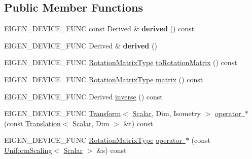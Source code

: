 \subsection*{Public Member Functions}
\begin{DoxyCompactItemize}
\item 
\mbox{\label{class_eigen_1_1_rotation_base_a1cae30fa6779f33fb835c91d4c65f54d}} 
E\+I\+G\+E\+N\+\_\+\+D\+E\+V\+I\+C\+E\+\_\+\+F\+U\+NC const Derived \& {\bfseries derived} () const
\item 
\mbox{\label{class_eigen_1_1_rotation_base_a32a9b98ea4ea05b04a5f5f4b138daef8}} 
E\+I\+G\+E\+N\+\_\+\+D\+E\+V\+I\+C\+E\+\_\+\+F\+U\+NC Derived \& {\bfseries derived} ()
\item 
E\+I\+G\+E\+N\+\_\+\+D\+E\+V\+I\+C\+E\+\_\+\+F\+U\+NC \mbox{\hyperlink{class_eigen_1_1_rotation_base_a83602509674c9d635551998460342951}{Rotation\+Matrix\+Type}} \mbox{\hyperlink{class_eigen_1_1_rotation_base_aac726e89402a427c605514ce31b01e42}{to\+Rotation\+Matrix}} () const
\item 
E\+I\+G\+E\+N\+\_\+\+D\+E\+V\+I\+C\+E\+\_\+\+F\+U\+NC \mbox{\hyperlink{class_eigen_1_1_rotation_base_a83602509674c9d635551998460342951}{Rotation\+Matrix\+Type}} \mbox{\hyperlink{class_eigen_1_1_rotation_base_a14ce23df5f0b2593a466f8130fe6bac9}{matrix}} () const
\item 
E\+I\+G\+E\+N\+\_\+\+D\+E\+V\+I\+C\+E\+\_\+\+F\+U\+NC Derived \mbox{\hyperlink{class_eigen_1_1_rotation_base_a2835ea92940986b4220cf47538a6bc41}{inverse}} () const
\item 
E\+I\+G\+E\+N\+\_\+\+D\+E\+V\+I\+C\+E\+\_\+\+F\+U\+NC \mbox{\hyperlink{class_eigen_1_1_transform}{Transform}}$<$ \mbox{\hyperlink{class_eigen_1_1_rotation_base_af9b43eac462d7aa70b018efd49c13ef4}{Scalar}}, Dim, Isometry $>$ \mbox{\hyperlink{class_eigen_1_1_rotation_base_aebcd2286f9c520e9d83cdb9a7287820c}{operator $\ast$}} (const \mbox{\hyperlink{class_eigen_1_1_translation}{Translation}}$<$ \mbox{\hyperlink{class_eigen_1_1_rotation_base_af9b43eac462d7aa70b018efd49c13ef4}{Scalar}}, Dim $>$ \&t) const
\item 
E\+I\+G\+E\+N\+\_\+\+D\+E\+V\+I\+C\+E\+\_\+\+F\+U\+NC \mbox{\hyperlink{class_eigen_1_1_rotation_base_a83602509674c9d635551998460342951}{Rotation\+Matrix\+Type}} \mbox{\hyperlink{class_eigen_1_1_rotation_base_a6ada89422adc98d1dadbb1b2eea1a062}{operator $\ast$}} (const \mbox{\hyperlink{class_eigen_1_1_uniform_scaling}{Uniform\+Scaling}}$<$ \mbox{\hyperlink{class_eigen_1_1_rotation_base_af9b43eac462d7aa70b018efd49c13ef4}{Scalar}} $>$ \&s) const

\end{DoxyCompactItemize}
